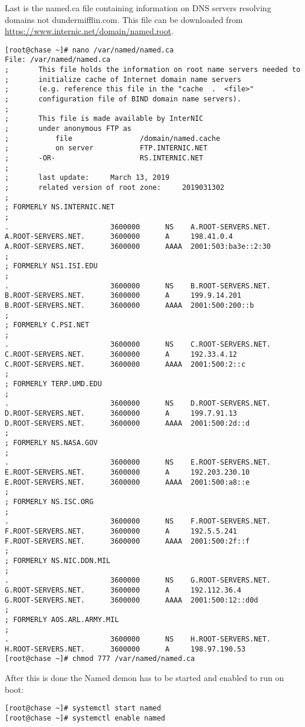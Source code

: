 \documentclass[11pt,onside]{article}
\begin{document}
Last is the named.ca file containing information on DNS servers resolving domains not dundermifflin.com. This file can be downloaded from \url{https://www.internic.net/domain/named.root}.
\begin{lstlisting}
[root@chase ~]# nano /var/named/named.ca
File: /var/named/named.ca
;       This file holds the information on root name servers needed to
;       initialize cache of Internet domain name servers
;       (e.g. reference this file in the "cache  .  <file>"
;       configuration file of BIND domain name servers).
;
;       This file is made available by InterNIC
;       under anonymous FTP as
;           file                /domain/named.cache
;           on server           FTP.INTERNIC.NET
;       -OR-                    RS.INTERNIC.NET
;
;       last update:     March 13, 2019
;       related version of root zone:     2019031302
;
; FORMERLY NS.INTERNIC.NET
;
.                        3600000      NS    A.ROOT-SERVERS.NET.
A.ROOT-SERVERS.NET.      3600000      A     198.41.0.4
A.ROOT-SERVERS.NET.      3600000      AAAA  2001:503:ba3e::2:30
;
; FORMERLY NS1.ISI.EDU
;
.                        3600000      NS    B.ROOT-SERVERS.NET.
B.ROOT-SERVERS.NET.      3600000      A     199.9.14.201
B.ROOT-SERVERS.NET.      3600000      AAAA  2001:500:200::b
;
; FORMERLY C.PSI.NET
;
.                        3600000      NS    C.ROOT-SERVERS.NET.
C.ROOT-SERVERS.NET.      3600000      A     192.33.4.12
C.ROOT-SERVERS.NET.      3600000      AAAA  2001:500:2::c
;
; FORMERLY TERP.UMD.EDU
;
.                        3600000      NS    D.ROOT-SERVERS.NET.
D.ROOT-SERVERS.NET.      3600000      A     199.7.91.13
D.ROOT-SERVERS.NET.      3600000      AAAA  2001:500:2d::d
;
; FORMERLY NS.NASA.GOV
;
.                        3600000      NS    E.ROOT-SERVERS.NET.
E.ROOT-SERVERS.NET.      3600000      A     192.203.230.10
E.ROOT-SERVERS.NET.      3600000      AAAA  2001:500:a8::e
;
; FORMERLY NS.ISC.ORG
;
.                        3600000      NS    F.ROOT-SERVERS.NET.
F.ROOT-SERVERS.NET.      3600000      A     192.5.5.241
F.ROOT-SERVERS.NET.      3600000      AAAA  2001:500:2f::f
;
; FORMERLY NS.NIC.DDN.MIL
;
.                        3600000      NS    G.ROOT-SERVERS.NET.
G.ROOT-SERVERS.NET.      3600000      A     192.112.36.4
G.ROOT-SERVERS.NET.      3600000      AAAA  2001:500:12::d0d
;
; FORMERLY AOS.ARL.ARMY.MIL
;
.                        3600000      NS    H.ROOT-SERVERS.NET.
H.ROOT-SERVERS.NET.      3600000      A     198.97.190.53
[root@chase ~]# chmod 777 /var/named/named.ca
\end{lstlisting}
After this is done the Named demon has to be started and enabled to run on boot:
\begin{lstlisting}
[root@chase ~]# systemctl start named
[root@chase ~]# systemctl enable named
\end{lstlisting}
\end{document}
